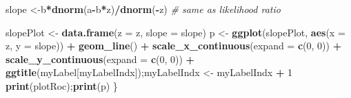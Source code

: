 \documentclass[]{book}
\newenvironment{Shaded}{\begin{snugshade}}{\end{snugshade}}
\newcommand{\CommentTok}[1]{\textcolor[rgb]{0.56,0.35,0.01}{\textit{#1}}}
\newcommand{\DataTypeTok}[1]{\textcolor[rgb]{0.13,0.29,0.53}{#1}}
\newcommand{\DecValTok}[1]{\textcolor[rgb]{0.00,0.00,0.81}{#1}}
\newcommand{\KeywordTok}[1]{\textcolor[rgb]{0.13,0.29,0.53}{\textbf{#1}}}
\newcommand{\NormalTok}[1]{#1}
\newcommand{\OperatorTok}[1]{\textcolor[rgb]{0.81,0.36,0.00}{\textbf{#1}}}
\newcommand{\StringTok}[1]{\textcolor[rgb]{0.31,0.60,0.02}{#1}}
\begin{document}
\begin{Shaded}
\begin{Highlighting}[]
\NormalTok{  slope <-b}\OperatorTok{*}\KeywordTok{dnorm}\NormalTok{(a}\OperatorTok{-}\NormalTok{b}\OperatorTok{*}\NormalTok{z)}\OperatorTok{/}\KeywordTok{dnorm}\NormalTok{(}\OperatorTok{-}\NormalTok{z) }\CommentTok{# same as likelihood ratio}
  
\NormalTok{  slopePlot <-}\StringTok{ }\KeywordTok{data.frame}\NormalTok{(}\DataTypeTok{z =}\NormalTok{ z, }\DataTypeTok{slope =}\NormalTok{ slope)}
\NormalTok{  p <-}\StringTok{ }\KeywordTok{ggplot}\NormalTok{(slopePlot, }\KeywordTok{aes}\NormalTok{(}\DataTypeTok{x =}\NormalTok{ z, }\DataTypeTok{y =}\NormalTok{ slope)) }\OperatorTok{+}\StringTok{ }
\StringTok{    }\KeywordTok{geom_line}\NormalTok{()  }\OperatorTok{+}\StringTok{ }
\StringTok{    }\KeywordTok{scale_x_continuous}\NormalTok{(}\DataTypeTok{expand =} \KeywordTok{c}\NormalTok{(}\DecValTok{0}\NormalTok{, }\DecValTok{0}\NormalTok{)) }\OperatorTok{+}\StringTok{ }
\StringTok{    }\KeywordTok{scale_y_continuous}\NormalTok{(}\DataTypeTok{expand =} \KeywordTok{c}\NormalTok{(}\DecValTok{0}\NormalTok{, }\DecValTok{0}\NormalTok{))  }\OperatorTok{+}
\StringTok{    }\KeywordTok{ggtitle}\NormalTok{(myLabel[myLabelIndx]);myLabelIndx <-}\StringTok{ }\NormalTok{myLabelIndx }\OperatorTok{+}\StringTok{ }\DecValTok{1}
  \KeywordTok{print}\NormalTok{(plotRoc);}\KeywordTok{print}\NormalTok{(p)}
\NormalTok{\}}
\end{Highlighting}
\end{Shaded}
\end{document}
